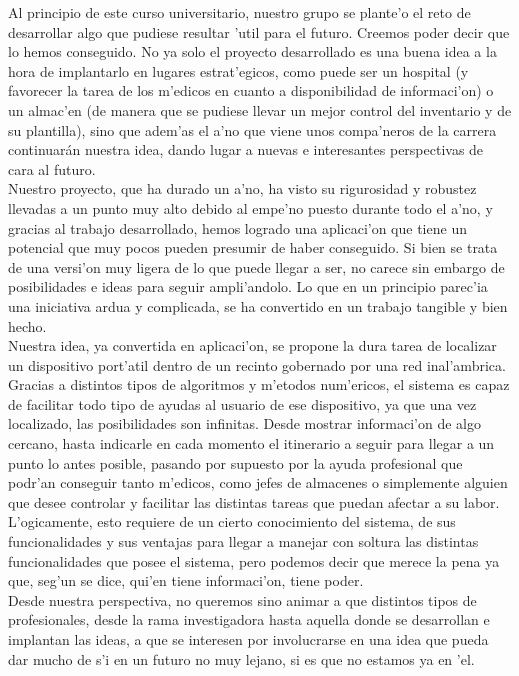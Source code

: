 Al principio de este curso universitario, nuestro grupo se plante'o el reto de desarrollar algo que pudiese resultar 'util para el futuro. Creemos poder decir que lo hemos conseguido. No ya solo el proyecto desarrollado es una buena idea a la hora de implantarlo en lugares estrat'egicos, como puede ser un hospital (y favorecer la tarea de los m'edicos en cuanto a disponibilidad de informaci'on) o un almac'en (de manera que se pudiese llevar un mejor control del inventario y de su plantilla), sino que adem'as el a'no que viene unos compa'neros de la carrera continuarán nuestra idea, dando lugar a nuevas e interesantes perspectivas de cara al futuro. \bigskip \\ Nuestro proyecto, que ha durado un a'no, ha visto su rigurosidad y robustez llevadas a un punto muy alto debido al empe'no puesto durante todo el a'no, y gracias al trabajo desarrollado, hemos logrado una aplicaci'on que tiene un potencial que muy pocos pueden presumir de haber conseguido. Si bien se trata de una versi'on muy ligera de lo que puede llegar a ser, no carece sin embargo de posibilidades e ideas para seguir ampli'andolo. Lo que en un principio parec'ia una iniciativa ardua y complicada, se ha convertido en un trabajo tangible y bien hecho. \bigskip \\ Nuestra idea, ya convertida en aplicaci'on, se propone la dura tarea de localizar un dispositivo port'atil dentro de un recinto gobernado por una red inal'ambrica. Gracias a distintos tipos de algoritmos y m'etodos num'ericos, el sistema es capaz de facilitar todo tipo de ayudas al usuario de ese dispositivo, ya que una vez localizado, las posibilidades son infinitas. Desde mostrar informaci'on de algo cercano, hasta indicarle en cada momento el itinerario a seguir para llegar a un punto lo antes posible, pasando por supuesto por la ayuda profesional que podr'an conseguir tanto m'edicos, como jefes de almacenes o simplemente alguien que desee controlar y facilitar las distintas tareas que puedan afectar a su labor.\bigskip \\ L'ogicamente, esto requiere de un cierto conocimiento del sistema, de sus funcionalidades y sus ventajas para llegar a manejar con soltura las distintas funcionalidades que posee el sistema, pero podemos decir que merece la pena ya que, seg'un se dice, qui'en tiene informaci'on, tiene poder. \bigskip \\ Desde nuestra perspectiva, no queremos sino animar a que distintos tipos de profesionales, desde la rama investigadora hasta aquella donde se desarrollan e implantan las ideas, a que se interesen por involucrarse en una idea que pueda dar mucho de s'i en un futuro no muy lejano, si es que no estamos ya en 'el.